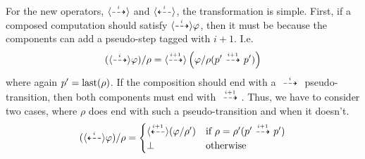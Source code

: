 For the new operators, $\pdmnd{i}$ and $\pdmndback{i}$, the transformation is simple.
First, if a composed computation should satisfy $\pdmnd{i}\phi$, then it must be
because the components can add a pseudo-step tagged with $i+1$. I.e.
\[
    (\pdmnd{i}\phi) / \rho = \pdmnd{i+1} \left( \phi / \rho(p'\ptrans{i+1} p') \right)
\]
where again $p' = \last(\rho)$. If the composition should end with a $\ptrans{i}$
pseudo-transition, then both components must end with $\ptrans{i+1}$. Thus, we
have to consider two cases, where $\rho$ does end with such a pseudo-transition
and when it doesn't.
\[
    (\pdmndback{i}\phi) / \rho = \begin{cases}
        \pdmndback{i+1} (\phi / \rho') & \textrm{if $\rho = \rho'(p' \ptrans{i+1} p')$} \\
        \false & \textrm{otherwise}
    \end{cases}
\]

